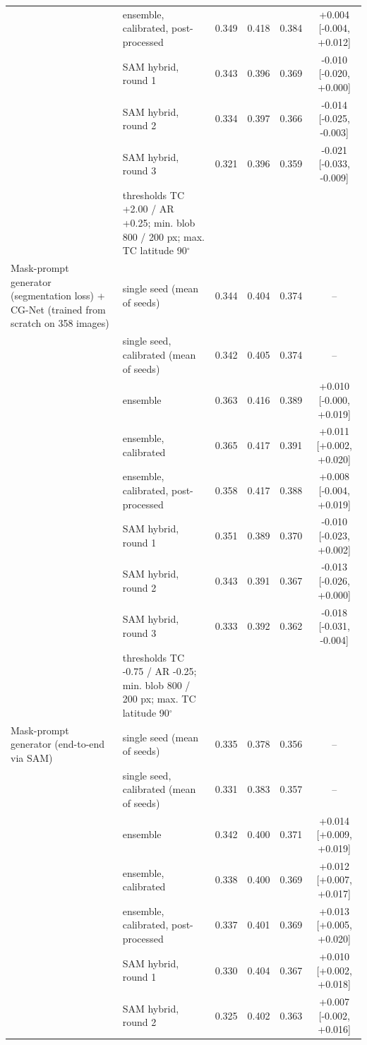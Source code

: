 \begin{table}[htbp]
\begin{adjustbox}{max width=\linewidth}
\begin{tabular}{llcccc}
 & ensemble, calibrated, post-processed & 0.349 & 0.418 & 0.384 & +0.004 [-0.004, +0.012] \\
 & SAM hybrid, round 1 & 0.343 & 0.396 & 0.369 & -0.010 [-0.020, +0.000] \\
 & SAM hybrid, round 2 & 0.334 & 0.397 & 0.366 & -0.014 [-0.025, -0.003] \\
 & SAM hybrid, round 3 & 0.321 & 0.396 & 0.359 & -0.021 [-0.033, -0.009] \\
 & \footnotesize thresholds TC +2.00 / AR +0.25; min. blob 800 / 200 px; max. TC latitude 90$^\circ$ &  &  &  &  \\
\midrule
Mask-prompt generator (segmentation loss) + CG-Net (trained from scratch on 358 images) & single seed (mean of seeds) & 0.344 & 0.404 & 0.374 & -- \\
 & single seed, calibrated (mean of seeds) & 0.342 & 0.405 & 0.374 & -- \\
 & ensemble & 0.363 & 0.416 & 0.389 & +0.010 [-0.000, +0.019] \\
 & ensemble, calibrated & 0.365 & 0.417 & 0.391 & +0.011 [+0.002, +0.020] \\
 & ensemble, calibrated, post-processed & 0.358 & 0.417 & 0.388 & +0.008 [-0.004, +0.019] \\
 & SAM hybrid, round 1 & 0.351 & 0.389 & 0.370 & -0.010 [-0.023, +0.002] \\
 & SAM hybrid, round 2 & 0.343 & 0.391 & 0.367 & -0.013 [-0.026, +0.000] \\
 & SAM hybrid, round 3 & 0.333 & 0.392 & 0.362 & -0.018 [-0.031, -0.004] \\
 & \footnotesize thresholds TC -0.75 / AR -0.25; min. blob 800 / 200 px; max. TC latitude 90$^\circ$ &  &  &  &  \\
\midrule
Mask-prompt generator (end-to-end via SAM) & single seed (mean of seeds) & 0.335 & 0.378 & 0.356 & -- \\
 & single seed, calibrated (mean of seeds) & 0.331 & 0.383 & 0.357 & -- \\
 & ensemble & 0.342 & 0.400 & 0.371 & +0.014 [+0.009, +0.019] \\
 & ensemble, calibrated & 0.338 & 0.400 & 0.369 & +0.012 [+0.007, +0.017] \\
 & ensemble, calibrated, post-processed & 0.337 & 0.401 & 0.369 & +0.013 [+0.005, +0.020] \\
 & SAM hybrid, round 1 & 0.330 & 0.404 & 0.367 & +0.010 [+0.002, +0.018] \\
 & SAM hybrid, round 2 & 0.325 & 0.402 & 0.363 & +0.007 [-0.002, +0.016] \\

\end{tabular}
\end{adjustbox}
\end{table}
